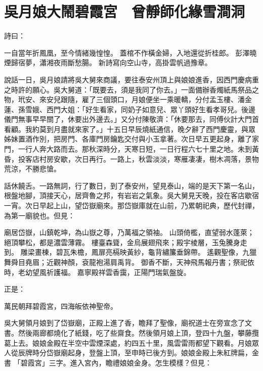 %

\chapter{吳月娘大鬧碧霞宮　曾靜師化緣雪澗洞}

\begin{showcontents}{}


詩曰：

一自當年折鳳凰，至今情緒幾惶惶。
蓋棺不作橫金婦，入地還從折桂郎。
彭澤曉煙歸宿夢，瀟湘夜雨斷愁腸。
新詩寫向空山寺，高掛雲帆過豫章。

說話一日，吳月娘請將吳大舅來商議，要往泰安州頂上與娘娘進香，因西門慶病重之時許的願心。吳大舅道：「既要去，須是我同了你去。」一面備辦香燭紙馬祭品之物，玳安、來安兒跟隨，雇了三個頭口，月娘便坐一乘暖轎，分付孟玉樓、潘金蓮、孫雪娥、西門大姐：「好生看家，同奶子如意兒、眾丫頭好生看孝哥兒。後邊儀門無事早早關了，休要出外邊去。」又分付陳敬濟：「休要那去，同傅伙計大門首看顧。我約莫到月盡就來家了。」十五日早辰燒紙通信，晚夕辭了西門慶靈，與眾姊妹置酒作別，把房門、各庫門房鑰匙交付與小玉拿著。次日早五更起身，離了家門，一行人奔大路而去。那秋深時分，天寒日短，一日行程六七十里之地。未到黃昏，投客店村房安歇，次日再行。一路上，秋雲淡淡，寒雁凄凄，樹木凋落，景物荒涼，不勝悲愴。

話休饒舌。一路無詞，行了數日，到了泰安州，望見泰山，端的是天下第一名山，根盤地腳，頂接天心，居齊魯之邦，有岩岩之氣象。吳大舅見天晚，投在客店歇宿一宵。次日早起上山，望岱嶽廟來。那岱嶽庫就在山前，乃累朝祀典，歷代封禪，為第一廟貌也。但見：

廟居岱嶽，山鎮乾坤，為山嶽之尊，乃萬福之領袖。 山頭倚檻，直望弱水蓬萊；絕頂攀松，都是濃雲薄霧。 樓臺森聳，金烏展翅飛來；殿宇棱層，玉兔騰身走到。 雕梁畫棟，碧瓦朱檐，鳳扉亮槅映黃紗，龜背繡簾垂錦帶。 遙觀聖像，九獵舞舜目堯眉；近觀神顏，袞龍袍湯肩禹背。 御香不斷，天神飛馬報丹書；祭祀依時，老幼望風祈護福。 嘉寧殿祥雲香靄，正陽門瑞氣盤旋。

正是：

萬民朝拜碧霞宮，四海皈依神聖帝。

吳大舅領月娘到了岱嶽廟，正殿上進了香，瞻拜了聖像，廟祝道士在旁宣念了文書。然後兩廊都燒化了紙錢，吃了些齋食。然後領月娘上頂，登四十九盤，攀藤攬葛上去。娘娘金殿在半空中雲煙深處，約四五十里，風雲雷雨都望下觀看。月娘眾人從辰牌時分岱嶽廟起身，登盤上頂，至申時已後方到。娘娘金殿上朱紅牌扁，金書 「碧霞宮」三字。進入宮內，瞻禮娘娘金身。怎生模樣？但見：


\end{showcontents}
